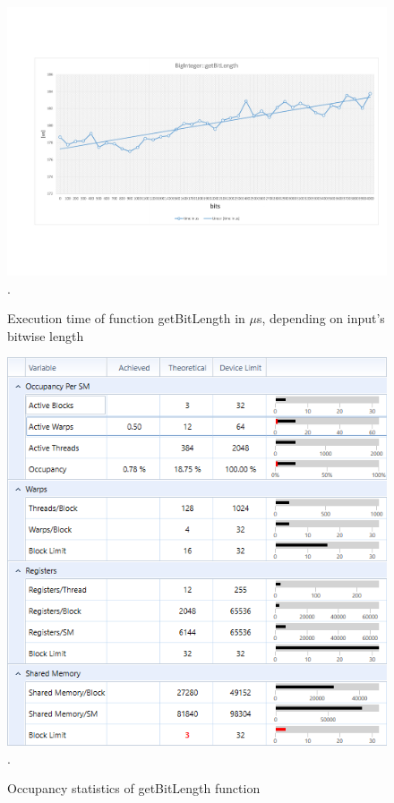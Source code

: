 \documentclass[oneside,openright,12pt,final,en]{mgr}
\begin{document}
\begin{figure}[H]
	\centering
	\includegraphics[width=\textwidth,trim={0.5cm 2.8cm 0.4cm 2.8cm},clip]{bitlength.pdf}.
	\caption{Execution time of function getBitLength in $\mu$s, depending on input's bitwise length}
	\label{fig:bitlength}
\end{figure}

\begin{figure}[H]
	\centering
	\includegraphics[width=\textwidth]{bitlength_occupancy}.
	\caption{Occupancy statistics of getBitLength function}
	\label{fig:bitlength_occupancy}
\end{figure}
\end{document}
